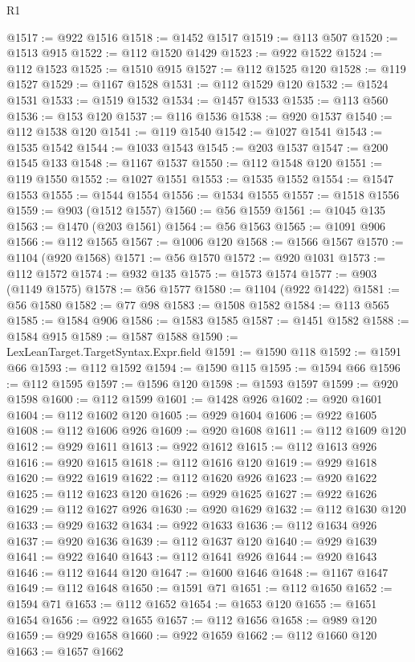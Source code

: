 \begin{lexlean}{R1}
\begin{coremodule}
@1517 := @922 @1516
@1518 := @1452 @1517
@1519 := @113 @507
@1520 := @1513 @915
@1522 := @112 @1520 @1429
@1523 := @922 @1522
@1524 := @112 @1523
@1525 := @1510 @915
@1527 := @112 @1525 @120
@1528 := @119 @1527
@1529 := @1167 @1528
@1531 := @112 @1529 @120
@1532 := @1524 @1531
@1533 := @1519 @1532
@1534 := @1457 @1533
@1535 := @113 @560
@1536 := @153 @120
@1537 := @116 @1536
@1538 := @920 @1537
@1540 := @112 @1538 @120
@1541 := @119 @1540
@1542 := @1027 @1541
@1543 := @1535 @1542
@1544 := @1033 @1543
@1545 := @203 @1537
@1547 := @200 @1545 @133
@1548 := @1167 @1537
@1550 := @112 @1548 @120
@1551 := @119 @1550
@1552 := @1027 @1551
@1553 := @1535 @1552
@1554 := @1547 @1553
@1555 := @1544 @1554
@1556 := @1534 @1555
@1557 := @1518 @1556
@1559 := @903 (@1512 @1557)
@1560 := @56 @1559
@1561 := @1045 @135
@1563 := @1470 (@203 @1561)
@1564 := @56 @1563
@1565 := @1091 @906
@1566 := @112 @1565
@1567 := @1006 @120
@1568 := @1566 @1567
@1570 := @1104 (@920 @1568)
@1571 := @56 @1570
@1572 := @920 @1031
@1573 := @112 @1572
@1574 := @932 @135
@1575 := @1573 @1574
@1577 := @903 (@1149 @1575)
@1578 := @56 @1577
@1580 := @1104 (@922 @1422)
@1581 := @56 @1580
@1582 := @77 @98
@1583 := @1508 @1582
@1584 := @113 @565
@1585 := @1584 @906
@1586 := @1583 @1585
@1587 := @1451 @1582
@1588 := @1584 @915
@1589 := @1587 @1588
@1590 := LexLeanTarget.TargetSyntax.Expr.field
@1591 := @1590 @118
@1592 := @1591 @66
@1593 := @112 @1592
@1594 := @1590 @115
@1595 := @1594 @66
@1596 := @112 @1595
@1597 := @1596 @120
@1598 := @1593 @1597
@1599 := @920 @1598
@1600 := @112 @1599
@1601 := @1428 @926
@1602 := @920 @1601
@1604 := @112 @1602 @120
@1605 := @929 @1604
@1606 := @922 @1605
@1608 := @112 @1606 @926
@1609 := @920 @1608
@1611 := @112 @1609 @120
@1612 := @929 @1611
@1613 := @922 @1612
@1615 := @112 @1613 @926
@1616 := @920 @1615
@1618 := @112 @1616 @120
@1619 := @929 @1618
@1620 := @922 @1619
@1622 := @112 @1620 @926
@1623 := @920 @1622
@1625 := @112 @1623 @120
@1626 := @929 @1625
@1627 := @922 @1626
@1629 := @112 @1627 @926
@1630 := @920 @1629
@1632 := @112 @1630 @120
@1633 := @929 @1632
@1634 := @922 @1633
@1636 := @112 @1634 @926
@1637 := @920 @1636
@1639 := @112 @1637 @120
@1640 := @929 @1639
@1641 := @922 @1640
@1643 := @112 @1641 @926
@1644 := @920 @1643
@1646 := @112 @1644 @120
@1647 := @1600 @1646
@1648 := @1167 @1647
@1649 := @112 @1648
@1650 := @1591 @71
@1651 := @112 @1650
@1652 := @1594 @71
@1653 := @112 @1652
@1654 := @1653 @120
@1655 := @1651 @1654
@1656 := @922 @1655
@1657 := @112 @1656
@1658 := @989 @120
@1659 := @929 @1658
@1660 := @922 @1659
@1662 := @112 @1660 @120
@1663 := @1657 @1662

\end{coremodule}
\end{lexlean}
